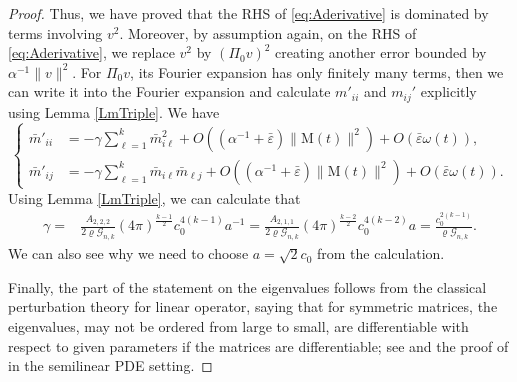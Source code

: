 \documentclass[11pt]{amsart}
\numberwithin{equation}{section}
\numberwithin{equation}{section}
\newcommand{\eps}{\varepsilon}
\newcommand{\cG}{\mathcal{G}}
\begin{document}
\begin{proof}
		Thus, we have proved that the RHS of \eqref{eq:Aderivative} is dominated by terms involving $v^2$. Moreover, by assumption again, on the RHS of \eqref{eq:Aderivative}, we replace $v^2$ by $(\Pi_0 v)^2$ creating another error bounded by $\alpha^{-1}\|v\|^2$. For $\Pi_0v$, its Fourier expansion has only finitely many terms, then we can write it into the Fourier expansion and calculate $m'_{ii}$ and $m_{ij}'$ explicitly using Lemma \ref{LmTriple}. We have 
		\begin{equation}\label{EqNeutral}
			\begin{cases}
				\bar m'_{ii}&=-\gamma \sum_{\ell=1}^k \bar m^2_{i\ell}+O((\alpha^{-1}+\bar\eps)\|\mathrm{M}(t)\|^2)+O(\bar\eps\omega(t)),
				\\
				\bar m'_{ij}&=-\gamma \sum_{\ell=1}^k \bar m_{i\ell} \bar m_{\ell j}+O((\alpha^{-1}+\bar\eps)\|\mathrm{M}(t)\|^2)+O(\bar\eps\omega(t)).
			\end{cases}
		\end{equation}
		Using Lemma \ref{LmTriple}, we can calculate that 
		\begin{equation}\label{Eqgamma}
			\begin{aligned}
				\gamma
				=&\frac{A_{2,2,2}}{2\varrho \cG_{n,k}}(4\pi)^{\frac{k-1}{2}}
				c_0^{4(k-1)} a^{-1}
				=\frac{A_{2,1,1}}{2\varrho \cG_{n,k}} (4\pi)^{\frac{k-2}{2}}c_0^{4(k-2)}a=
				\frac{c_0^{2(k-1)}}{\varrho \cG_{n,k}}
				.
			\end{aligned}    
		\end{equation}
		We can also see why we need to choose $a=\sqrt{2}c_0$ from the calculation.
		
		Finally, the part of the statement on the eigenvalues follows from the classical perturbation theory for linear operator, saying that for symmetric matrices, the eigenvalues, may not be ordered from large to small, are differentiable with respect to given parameters if the matrices are differentiable; see \cite[Chapter Two, Section 6, Theorem 6.8]{Kato95_PertubLinearOp} and the proof of \cite[Lemma 3.1]{V2} in the semilinear PDE setting. 
	\end{proof}
	
\end{document}
